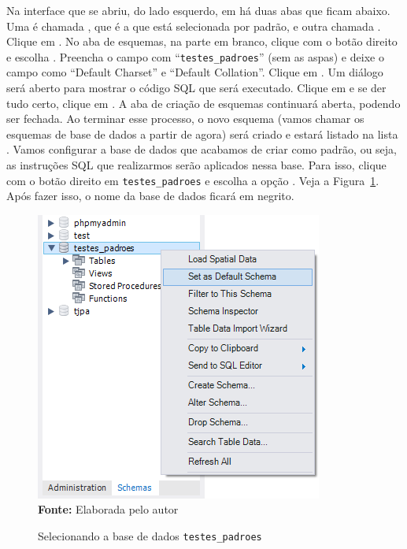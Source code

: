Na interface que se abriu, do lado esquerdo, em  há duas abas que ficam abaixo. Uma é chamada , que é a que está selecionada por padrão, e outra chamada . Clique em . No aba de esquemas, na parte em branco, clique com o botão direito e escolha . Preencha o campo  com ``\texttt{testes\_padroes}'' (sem as aspas) e deixe o campo  como ``Default Charset'' e ``Default Collation''. Clique em . Um diálogo será aberto para mostrar o código SQL que será executado. Clique em  e se der tudo certo, clique em . A aba de criação de esquemas continuará aberta, podendo ser fechada. Ao terminar esse processo, o novo esquema (vamos chamar os esquemas de base de dados a partir de agora) será criado e estará listado na lista . Vamos configurar a base de dados que acabamos de criar como padrão, ou seja, as instruções SQL que realizarmos serão aplicados nessa base. Para isso, clique com o botão direito em \texttt{testes\_padroes} e escolha a opção . Veja a Figura~\ref{fig:cap04SelecionandoEsquema}. Após fazer isso, o nome da base de dados ficará em negrito.

\FloatBarrier
\begin{figure}[!htbp]
    \centering
    \caption{Selecionando a base de dados \texttt{testes\_padroes}}
    \includegraphics[scale=0.8]{imagens/cap04SelecionandoEsquema}
    \\\textbf{Fonte:} Elaborada pelo autor
    \label{fig:cap04SelecionandoEsquema}
\end{figure}
\FloatBarrier

